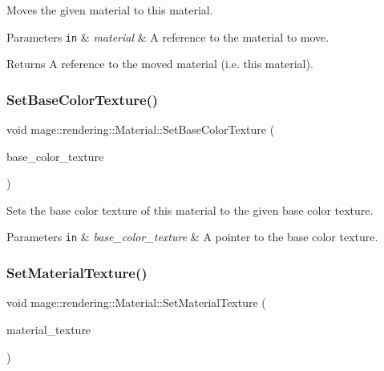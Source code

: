 Moves the given material to this material.


\begin{DoxyParams}[1]{Parameters}
\mbox{\tt in}  & {\em material} & A reference to the material to move. \\
\hline
\end{DoxyParams}
\begin{DoxyReturn}{Returns}
A reference to the moved material (i.\+e. this material). 
\end{DoxyReturn}
\mbox{\label{classmage_1_1rendering_1_1_material_aae6ebdb492e06a39e1f420154962ab0f}} 
\subsubsection{\texorpdfstring{Set\+Base\+Color\+Texture()}{SetBaseColorTexture()}}
{\footnotesize\ttfamily void mage\+::rendering\+::\+Material\+::\+Set\+Base\+Color\+Texture (\begin{DoxyParamCaption}\item[{\mbox{\hyperlink{namespacemage_1_1rendering_a6f3ae54f825328465b0cdde0f0de4a36}{Texture\+Ptr}}}]{base\+\_\+color\+\_\+texture }\end{DoxyParamCaption})\hspace{0.3cm}{\ttfamily [noexcept]}}

Sets the base color texture of this material to the given base color texture.


\begin{DoxyParams}[1]{Parameters}
\mbox{\tt in}  & {\em base\+\_\+color\+\_\+texture} & A pointer to the base color texture. \\
\hline
\end{DoxyParams}
\mbox{\label{classmage_1_1rendering_1_1_material_a6bf886a16cbe84c55664701ab3a82658}} 
\subsubsection{\texorpdfstring{Set\+Material\+Texture()}{SetMaterialTexture()}}
{\footnotesize\ttfamily void mage\+::rendering\+::\+Material\+::\+Set\+Material\+Texture (\begin{DoxyParamCaption}\item[{\mbox{\hyperlink{namespacemage_1_1rendering_a6f3ae54f825328465b0cdde0f0de4a36}{Texture\+Ptr}}}]{material\+\_\+texture }\end{DoxyParamCaption})\hspace{0.3cm}{\ttfamily [noexcept]}}

